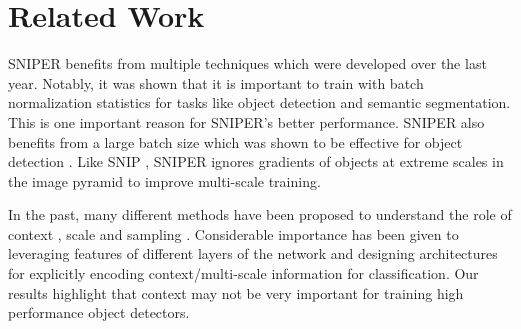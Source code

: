 \documentclass{article}
\begin{document}
\section{Related Work}
SNIPER benefits from multiple techniques which were developed over the last year. Notably, it was shown that it is important to train with batch normalization statistics \cite{peng2017megdet,liu2018path,zhao2017pyramid} for tasks like object detection and semantic segmentation. This is one important reason for SNIPER's better performance. SNIPER also benefits from a large batch size which was shown to be effective for object detection \cite{peng2017megdet}. Like SNIP \cite{singh2017analysis}, SNIPER ignores gradients of objects at extreme scales in the image pyramid to improve  multi-scale training. 


In the past, many different methods have been proposed to understand the role of context \cite{yu2015multi,bell2016inside,mottaghi2014role}, scale \cite{cai2016unified,yang2016exploit,lin2017feature, najibi2017ssh} and sampling \cite{lin2018focal,shrivastava2016training,boda2017sampling,boda2018universal}. Considerable importance has been given to leveraging features of different layers of the network and designing architectures for explicitly encoding context/multi-scale information \cite{najibi2017ssh,liu2016ssd,zagoruyko2016multipath,zeng2017crafting} for classification. Our results highlight that context may not be very important for training high performance object detectors. 

\end{document}
